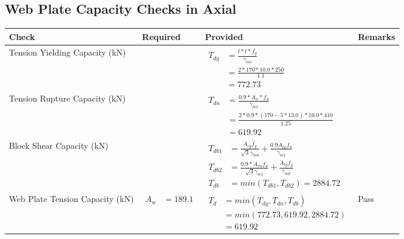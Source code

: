 \documentclass{article}%
\begin{document}
\subsection{Web Plate Capacity Checks in Axial}%
\label{subsec:WebPlateCapacityChecksinAxial}%
\renewcommand{\arraystretch}{1.2}%
\begin{longtable}{|p{4cm}|p{4cm}|p{7cm}|p{1.5cm}|}%
\hline%
\rowcolor{OsdagGreen}%
Check&Required&Provided&Remarks\\%
\hline%
\endhead%
\hline%
Tension Yielding Capacity (kN)&&$\begin{aligned} T_{dg} &= \frac{l*t*f_y}{\gamma_{mo}}\\ &=\frac{2*170*10.0*250}{1.1}\\ &=772.73\end{aligned}$&\\%
\hline%
Tension Rupture Capacity (kN)&&$\begin{aligned} T_{dn} &= \frac{0.9*A_{n}*f_u}{\gamma_{m1}}\\ &=\frac{2*0.9* (170-5*13.0)*10.0*410}{1.25}\\ &=619.92\end{aligned}$&\\%
\hline%
Block Shear Capacity (kN)&&$\begin{aligned}T_{db1} &= \frac{A_{vg} f_{y}}{\sqrt{3} \gamma_{m0}} + \frac{0.9 A_{tn} f_{u}}{\gamma_{m1}}\\ T_{db2} &= \frac{0.9*A_{vn} f_{u}}{\sqrt{3} \gamma_{m1}} + \frac{A_{tg} f_{y}}{\gamma_{m0}}\\ T_{db} &= min(T_{db1}, T_{db2})= 2884.72\end{aligned}$&\\%
\hline%
Web Plate Tension Capacity (kN)&$\begin{aligned} A_w &=189.1\end{aligned}$&$\begin{aligned} T_d &= min(T_{dg},T_{dn},T_{db})\\ &= min(772.73,619.92,2884.72)\\ &=619.92\end{aligned}$&Pass\\%
\hline%
\end{longtable}

%
\newpage%
\end{document}
